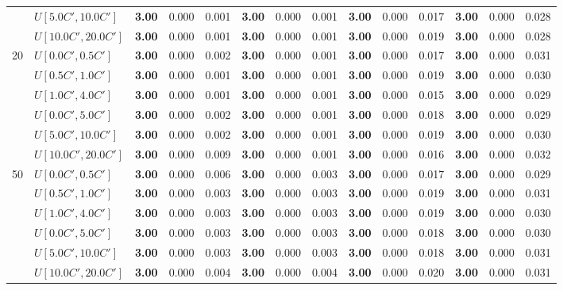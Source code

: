 \begin{table}[h]
{\begin{tabular}{|l|l||l|l|l||l|l|l||l|l|l||l|l|l|}
       & $U[5.0C',10.0C']$ & \textbf{3.00} & 0.000 & 0.001 & \textbf{3.00} & 0.000 & 0.001 & \textbf{3.00} & 0.000 & 0.017 & \textbf{3.00} & 0.000 & 0.028 \\
       & $U[10.0C',20.0C']$ & \textbf{3.00} & 0.000 & 0.001 & \textbf{3.00} & 0.000 & 0.001 & \textbf{3.00} & 0.000 & 0.019 & \textbf{3.00} & 0.000 & 0.028 \\
      \hline\hline
      \multirow{6}{*}{20} & $U[0.0C',0.5C']$ & \textbf{3.00} & 0.000 & 0.002 & \textbf{3.00} & 0.000 & 0.001 & \textbf{3.00} & 0.000 & 0.017 & \textbf{3.00} & 0.000 & 0.031 \\
       & $U[0.5C',1.0C']$ & \textbf{3.00} & 0.000 & 0.001 & \textbf{3.00} & 0.000 & 0.001 & \textbf{3.00} & 0.000 & 0.019 & \textbf{3.00} & 0.000 & 0.030 \\
       & $U[1.0C',4.0C']$ & \textbf{3.00} & 0.000 & 0.001 & \textbf{3.00} & 0.000 & 0.001 & \textbf{3.00} & 0.000 & 0.015 & \textbf{3.00} & 0.000 & 0.029 \\
       & $U[0.0C',5.0C']$ & \textbf{3.00} & 0.000 & 0.002 & \textbf{3.00} & 0.000 & 0.001 & \textbf{3.00} & 0.000 & 0.018 & \textbf{3.00} & 0.000 & 0.029 \\
       & $U[5.0C',10.0C']$ & \textbf{3.00} & 0.000 & 0.002 & \textbf{3.00} & 0.000 & 0.001 & \textbf{3.00} & 0.000 & 0.019 & \textbf{3.00} & 0.000 & 0.030 \\
       & $U[10.0C',20.0C']$ & \textbf{3.00} & 0.000 & 0.009 & \textbf{3.00} & 0.000 & 0.001 & \textbf{3.00} & 0.000 & 0.016 & \textbf{3.00} & 0.000 & 0.032 \\
      \hline\hline
      \multirow{6}{*}{50} & $U[0.0C',0.5C']$ & \textbf{3.00} & 0.000 & 0.006 & \textbf{3.00} & 0.000 & 0.003 & \textbf{3.00} & 0.000 & 0.017 & \textbf{3.00} & 0.000 & 0.029 \\
       & $U[0.5C',1.0C']$ & \textbf{3.00} & 0.000 & 0.003 & \textbf{3.00} & 0.000 & 0.003 & \textbf{3.00} & 0.000 & 0.019 & \textbf{3.00} & 0.000 & 0.031 \\
       & $U[1.0C',4.0C']$ & \textbf{3.00} & 0.000 & 0.003 & \textbf{3.00} & 0.000 & 0.003 & \textbf{3.00} & 0.000 & 0.019 & \textbf{3.00} & 0.000 & 0.030 \\
       & $U[0.0C',5.0C']$ & \textbf{3.00} & 0.000 & 0.003 & \textbf{3.00} & 0.000 & 0.003 & \textbf{3.00} & 0.000 & 0.018 & \textbf{3.00} & 0.000 & 0.030 \\
       & $U[5.0C',10.0C']$ & \textbf{3.00} & 0.000 & 0.003 & \textbf{3.00} & 0.000 & 0.003 & \textbf{3.00} & 0.000 & 0.018 & \textbf{3.00} & 0.000 & 0.031 \\
       & $U[10.0C',20.0C']$ & \textbf{3.00} & 0.000 & 0.004 & \textbf{3.00} & 0.000 & 0.004 & \textbf{3.00} & 0.000 & 0.020 & \textbf{3.00} & 0.000 & 0.031 \\
      \hline
      \end{tabular}
      }
      \label{tab:pcpn20}\end{table}


